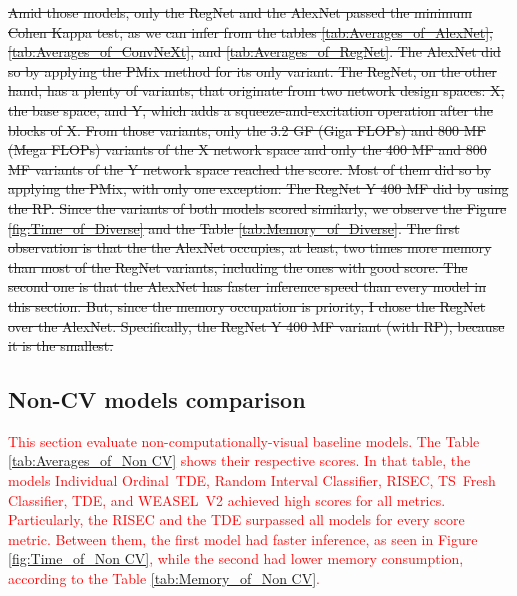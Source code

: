 \sout{
Amid those models, only the RegNet and the AlexNet passed the minimum Cohen Kappa test, as we can infer from the tables \ref{tab:Averages_of_AlexNet}, \ref{tab:Averages_of_ConvNeXt}, and \ref{tab:Averages_of_RegNet}. The AlexNet did so by applying the \gls{PMix} method for its only variant. The RegNet, on the other hand, has a plenty of variants, that originate from two network design spaces: X, the base space, and Y, which adds a squeeze-and-excitation operation after the blocks of X. From those variants, only the 3.2 GF (Giga FLOPs) and 800 MF (Mega FLOPs) variants of the X network space and only the 400 MF and 800 MF variants of the Y network space reached the score. Most of them did so by applying the \gls{PMix}, with only one exception: The RegNet Y 400 MF did by using the \gls{RP}. Since the variants of both models scored similarly, we observe the Figure \ref{fig:Time_of_Diverse} and the Table \ref{tab:Memory_of_Diverse}. The first observation is that the the AlexNet occupies, at least, two times more memory than most of the RegNet variants, including the ones with good score. The second one is that the AlexNet has faster inference speed than every model in this section. But, since the memory occupation is priority, I chose the RegNet over the AlexNet. Specifically, the RegNet Y 400 MF variant (with \gls{RP}), because it is the smallest.  
}






\FloatBarrier

\subsection{Non-CV models comparison}

\textcolor{red}{
This section evaluate non-computationally-visual baseline models. The Table \ref{tab:Averages_of_Non CV} shows their respective scores. In that table, the models Individual \mbox{Ordinal TDE}, Random Interval Classifier, \gls{RISEC}, \mbox{TS Fresh} Classifier, \gls{TDE}, and \mbox{WEASEL V2} achieved high scores for all metrics. Particularly, the \gls{RISEC} and the \gls{TDE} surpassed all models for every score metric. Between them, the first model had faster inference, as seen in Figure \ref{fig:Time_of_Non CV}, while the second had lower memory consumption, according to the Table \ref{tab:Memory_of_Non CV}.
}

